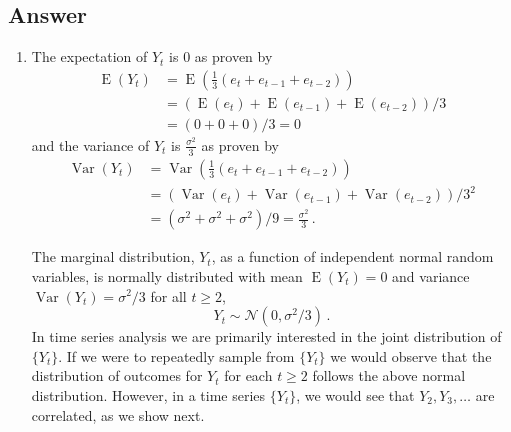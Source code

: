 \documentclass[10pt]{fphw}
\newcommand{\var}{\operatorname{Var}}
\newcommand{\expect}{\operatorname{E}}
\begin{document}
\subsection*{Answer}
\begin{enumerate}
\item The expectation of $Y_t$ is $0$ as proven by
\begin{equation}
\begin{split}
	\expect(Y_t)
		&= \expect\left(\frac{1}{3}(e_{t} + e_{t-1} + e_{t-2})\right)\\
		&= (\expect(e_{t}) + \expect(e_{t-1}) + \expect(e_{t-2}))/3\\
		&= (0+0+0)/3 = 0
\end{split}		
\end{equation}	
and the variance of $Y_t$ is $\frac{\sigma^2}{3}$ as proven by
\begin{equation}
\begin{split}
	\var(Y_t)
	&= \var\left(\frac{1}{3}(e_{t} + e_{t-1} + e_{t-2})\right)\\
	&= (\var(e_{t}) + \var(e_{t-1}) + \var(e_{t-2}))/3^2\\
	&= (\sigma^2 + \sigma^2 + \sigma^2)/9 = \frac{\sigma^2}{3}\,.
\end{split}
\end{equation}

The marginal distribution, $Y_t$, as a function of independent normal random variables, is normally distributed
with mean $\expect(Y_t) = 0$ and variance $\var(Y_t) = \sigma^2/3$ for all $t \geq 2$,
\begin{equation}
\label{eq:marginal_Yt}
    Y_t \sim \mathcal{N}(0,\sigma^2/3)\,.
\end{equation}
In time series analysis we are primarily interested in the joint distribution of $\{Y_t\}$.
If we were to repeatedly sample from $\{Y_t\}$ we would observe that the distribution 
of outcomes for $Y_t$ for each $t \geq 2$ follows the above normal distribution.
However, in a time series $\{Y_t\}$, we would see that $Y_2,Y_3,\ldots$ are correlated,
as we show next.


\end{enumerate}
\end{document}
